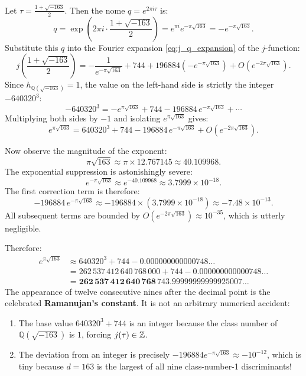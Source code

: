 \documentclass[a4paper]{article}
\begin{document}
Let $\tau = \frac{1 + \sqrt{-163}}{2}$. Then the nome $q = e^{2\pi i \tau}$ is:
\begin{equation}
 q = \exp\left(2\pi i \cdot \frac{1 + \sqrt{-163}}{2}\right) = e^{\pi i} e^{-\pi \sqrt{163}} = - e^{-\pi \sqrt{163}}.
\end{equation}
Substitute this $q$ into the Fourier expansion \eqref{eq:j_q_expansion} of the $j$-function:
\begin{equation}
 j\left(\frac{1 + \sqrt{-163}}{2}\right) = -\frac{1}{e^{-\pi \sqrt{163}}} + 744 + 196884 \left(-e^{-\pi \sqrt{163}}\right) + O\left(e^{-2\pi \sqrt{163}}\right).
\end{equation}
Since $h_{\mathbb{Q}(\sqrt{-163})} = 1$, the value on the left-hand side is strictly the integer $-640320^3$:
\begin{equation}
 -640320^3 = -e^{\pi \sqrt{163}} + 744 - 196884 \, e^{-\pi \sqrt{163}} + \cdots
\end{equation}
Multiplying both sides by $-1$ and isolating $e^{\pi \sqrt{163}}$ gives:
\begin{equation}
 e^{\pi \sqrt{163}} = 640320^3 + 744 - 196884 \, e^{-\pi \sqrt{163}} + O\left(e^{-2\pi \sqrt{163}}\right).
 \label{eq:ramanujan_almost_int}
\end{equation}

Now observe the magnitude of the exponent:
\begin{equation}
 \pi \sqrt{163} \approx \pi \times 12.767145 \approx 40.109968.
\end{equation}
The exponential suppression is astonishingly severe:
\begin{equation}
 e^{-\pi \sqrt{163}} \approx e^{-40.109968} \approx 3.7999 \times 10^{-18}.
\end{equation}
The first correction term is therefore:
\begin{equation}
 -196884 \, e^{-\pi \sqrt{163}} \approx -196884 \times (3.7999 \times 10^{-18}) \approx -7.48 \times 10^{-13}.
\end{equation}
All subsequent terms are bounded by $O(e^{-2\pi \sqrt{163}}) \approx 10^{-35}$, which is utterly negligible.

Therefore:
\begin{align}
 e^{\pi \sqrt{163}} &\approx 640320^3 + 744 - 0.000000000000748 \dots \nonumber\\
 &= 262\,537\,412\,640\,768\,000 + 744 - 0.000000000000748 \dots \nonumber\\
 &= \mathbf{262\,537\,412\,640\,768\,743.99999999999925007\dots}
\end{align}
The appearance of twelve consecutive nines after the decimal point is the celebrated \textbf{Ramanujan's constant}. It is not an arbitrary numerical accident:
\begin{enumerate}
 \item The base value $640320^3 + 744$ is an integer because the class number of $\mathbb{Q}(\sqrt{-163})$ is $1$, forcing $j(\tau) \in \mathbb{Z}$.
 \item The deviation from an integer is precisely $-196884 e^{-\pi \sqrt{163}} \approx -10^{-12}$, which is tiny because $d = 163$ is the largest of all nine class-number-1 discriminants!
\end{enumerate}
\end{document}
